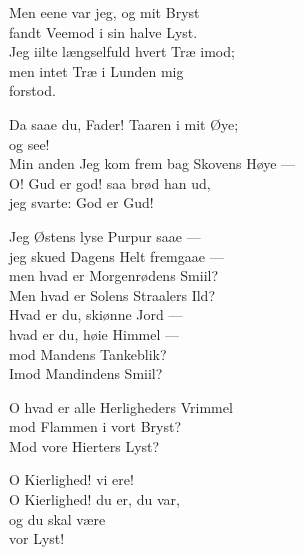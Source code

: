 \documentclass[parskip=full]{scrreprt}
\begin{document}
\begin{multicols}{2}
Men eene var jeg, og mit Bryst\\
fandt Veemod i sin halve Lyst.\\
Jeg iilte længselfuld hvert Træ imod;\\
men intet Træ i Lunden mig\\
\hspace*{1em}forstod.

Da saae du, Fader! Taaren i mit Øye;\\
og see!\\
Min anden Jeg kom frem bag Skovens Høye —\\
O! Gud er god! saa brød han ud,\\
jeg svarte: God er Gud!

Jeg Østens lyse Purpur saae —\\
jeg skued Dagens Helt fremgaae —\\
men hvad er Morgenrødens Smiil?\\
Men hvad er Solens Straalers Ild?\\
Hvad er du, skiønne Jord —\\
hvad er du, høie Himmel —\\
mod Mandens Tankeblik?\\
Imod Mandindens Smiil?

O hvad er alle Herligheders Vrimmel\\
mod Flammen i vort Bryst?\\
Mod vore Hierters Lyst?

O Kierlighed! vi ere!\\
O Kierlighed! du er, du var,\\
og du skal være\\
vor Lyst!
\end{multicols}
\end{document}
